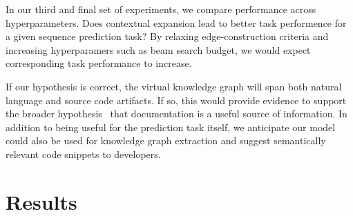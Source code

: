 \documentclass[11pt]{article}
\begin{document}
In our third and final set of experiments, we compare performance across hyperparameters. Does contextual expansion lead to better task performence for a given sequence prediction task? By relaxing edge-construction criteria and increasing hyperparamers such as beam search budget, we would expect corresponding task performance to increase.

If our hypothesis is correct, the virtual knowledge graph will span both natural language and source code artifacts. If so, this would provide evidence to support the broader hypothesis~\cite{guo2017semantically} that documentation is a useful source of information. In addition to being useful for the prediction task itself, we anticipate our model could also be used for knowledge graph extraction and suggest semantically relevant code snippets to developers.


%
%

\section{Results}\label{sec:results}
\end{document}
